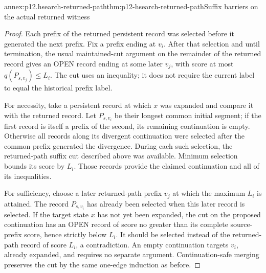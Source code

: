 \begin{annexitem}{annex:p12.hsearch-returned-path}{thm:p12-hsearch-returned-path}{Suffix barriers on the actual returned witness}
\begin{proof}
Each prefix of the returned persistent record was selected before it
generated the next prefix. Fix a prefix ending at \(v_i\). After
that selection and until termination, the usual maintained-cut argument
on the remainder of the returned record gives an OPEN record ending
at some later \(v_j\), with score at most
\(q(P_{s,v_j})\le L_i\). The cut uses an inequality; it does not
require the current label to equal the historical prefix label.

For necessity, take a persistent record at which \(x\) was expanded
and compare it with the returned record. Let \(P_{s,v_i}\) be
their longest common initial segment; if the first record is itself a
prefix of the second, its remaining continuation is empty. Otherwise
all records along its divergent continuation were selected after the
common prefix generated the divergence. During each such selection,
the returned-path suffix cut described above was available. Minimum
selection bounds its score by \(L_i\). Those records provide the
claimed continuation and all of its inequalities.

For sufficiency, choose a later returned-path prefix \(v_j\) at which
the maximum \(L_i\) is attained. The record \(P_{s,v_i}\) has
already been selected when this later record is selected. If the target
state \(x\) has not yet been expanded, the cut on the proposed
continuation has an OPEN record of score no greater than its complete
source-prefix score, hence strictly below \(L_i\). It should be
selected instead of the returned-path record of score \(L_i\), a
contradiction. An empty continuation targets \(v_i\), already
expanded, and requires no separate argument. Continuation-safe merging
preserves the cut by the same one-edge induction as before.
\end{proof}
\end{annexitem}

